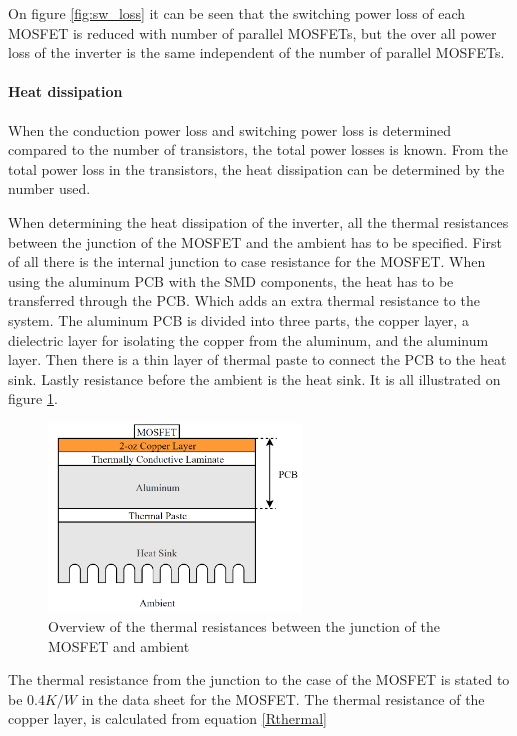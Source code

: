 On figure \ref{fig:sw_loss} it can be seen that the switching power loss of each MOSFET is reduced with number of parallel MOSFETs, but the over all power loss of the inverter is the same independent of the number of parallel MOSFETs.

\paragraph{Heat dissipation}
When the conduction power loss and switching power loss is determined compared to the number of transistors, the total power losses is known. From the total power loss in the transistors, the heat dissipation can be determined by the number used.

When determining the heat dissipation of the inverter, all the thermal resistances between the junction of the MOSFET and the ambient has to be specified.
First of all there is the internal junction to case resistance for the MOSFET.
When using the aluminum PCB with the SMD components, the heat has to be transferred through the PCB. Which adds an extra thermal resistance to the system. The aluminum PCB is divided into three parts, the copper layer, a dielectric layer for isolating the copper from the aluminum, and the aluminum layer.
Then there is a thin layer of thermal paste to connect the PCB to the heat sink. Lastly resistance before the ambient is the heat sink. It is all illustrated on figure \ref{fig:thermal_overview}.

    \begin{figure}[H]
		\centering
		\includegraphics[width=0.6\textwidth]{pictures/hardware/Power_Board/Thermal_overview.png}
		\caption{Overview of the thermal resistances between the junction of the MOSFET and ambient}
		\label{fig:thermal_overview}
	\end{figure}
	
The thermal resistance from the junction to the case of the MOSFET is stated to be $0.4 K/W$ in the data sheet for the MOSFET.\cite{mosfet}
The thermal resistance of the copper layer, is calculated from equation \ref{Rthermal}

